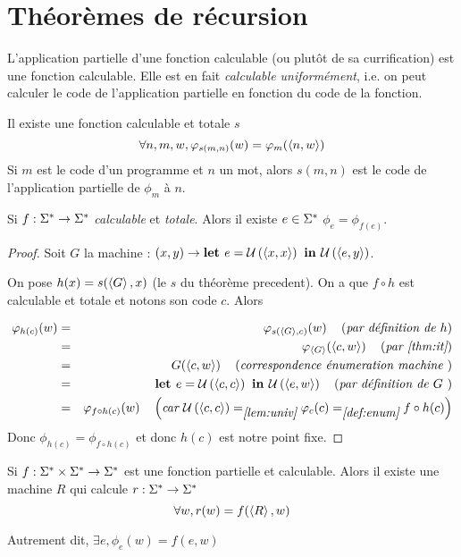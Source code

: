 \section{Théorèmes de récursion}


L'application partielle d'une fonction calculable (ou plutôt de sa currification)  est une fonction calculable.
Elle est en fait \emph{calculable uniformément}, i.e. on peut calculer le code de l'application partielle en fonction
du code de la fonction.

\begin{theorem}\label{thm:it}
	Il existe une fonction calculable et totale $s$ \tlq
	$$\forall n,m,w, \varphi_{s(m,n)}(w) = \varphi_m(\left\langle n,w\right\rangle)$$
	Si $m$ est le code d'un programme et $n$ un mot, alors $s(m,n)$ est le code de l'application partielle de $\phi_m$ à $n$.
\end{theorem}

\begin{theorem}
	Si $ f : \Sigma^{*} \to \Sigma^{*}$ \emph{calculable} et \emph {totale}. Alors il existe $e \in \Sigma^{*}$ \tq $\phi_e = \phi_{f(e)}$.
\end{theorem}


\begin{proof}
	Soit $G$ la machine : $(x,y) \to \textbf{let } e = \mathcal U \left(\left\langle x,x\right\rangle\right) \textbf{ in } {\mathcal U \left(\left\langle e,y\right\rangle\right)}$.

	On pose $h(x) = s(\left\langle G\right\rangle, x)$ (le $s$ du théorème precedent). On a que $f \circ h$ est calculable et totale et notons son code $c$. Alors

	\begin{eqnarray*}
		\varphi_{h(c)} (w) &=& \varphi_{s(\left\langle G\right\rangle, c)} (w) \quad\left(\textit{par définition de $h$}\right) \\
		&=& \varphi_{\left\langle G\right\rangle} (\left\langle c, w\right\rangle) \quad\left(\textit{par \ref{thm:it}}\right) \\
		&=& G (\left\langle c, w\right\rangle) \quad\left(\textit{correspondence énumeration machine }\right)\\
		&=& \textbf{let } e = \mathcal U \left(\left\langle c,c\right\rangle\right) \textbf{ in } \mathcal U \left(\left\langle e,w\right\rangle\right) \quad\left(\textit{par définition de $G$ }\right)\\
		&=& \varphi_{f \circ h (c)}(w) \quad\left(\textit{car $\mathcal U \left(\left\langle c,c\right\rangle\right) =_{\ref{lem:univ}} \varphi_c(c) =_{\ref{def:enum}} f \circ h (c)$}\right)
	\end{eqnarray*}
	Donc $\phi_{h(c)} = \phi_{f \circ h (c)}$ et donc $h(c)$ est notre point fixe.
\end{proof}


\begin{theorem}[de récursion]
	Si $f : \Sigma^{*} \times \Sigma^{*} \to \Sigma^{*}$ est une fonction partielle et calculable. Alors il existe une machine $R$ qui calcule $r : \Sigma^{*} \to \Sigma^{*} $ \tq
	$$ \forall w, r(w) =  f (\left\langle R\right\rangle, w)$$

	Autrement dit, $\exists e, \phi_e (w) = f (e, w)$
\end{theorem}


